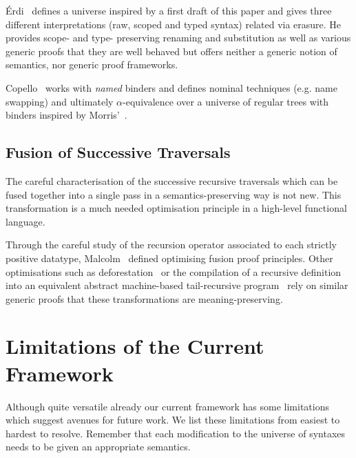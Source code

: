 Érdi~\citeyear{gergodraft} defines a universe inspired by a first draft of this
paper and gives three different interpretations (raw, scoped and typed syntax)
related via erasure. He provides scope- and type- preserving renaming and
substitution as well as various generic proofs that they are well behaved but
offers neither a generic notion of semantics, nor generic proof frameworks.

Copello~\citeyear{copello2017} works with \emph{named} binders and
defines nominal techniques (e.g. name swapping) and ultimately $\alpha$-equivalence
over a universe of regular trees with binders inspired by Morris'~\citeyear{morris-regulartt}.

\subsection{Fusion of Successive Traversals}

The careful characterisation of the successive recursive traversals which can be
fused together into a single pass in a semantics-preserving way is not new. This
transformation is a much needed optimisation principle in a high-level functional
language.

Through the careful study of the recursion operator associated to each
strictly positive datatype,
Malcolm~\citeyear{DBLP:journals/scp/Malcolm90} defined optimising
fusion proof principles.
%
Other optimisations such as deforestation~\cite{DBLP:journals/tcs/Wadler90}
or the compilation of a recursive definition into an equivalent abstract
machine-based tail-recursive program~\cite{DBLP:conf/icfp/CortinasS18}
rely on similar generic proofs that these transformations are meaning-preserving.


\section{Limitations of the Current Framework}


Although quite versatile already our current framework has some limitations
which suggest avenues for future work. We list these limitations from easiest
to hardest to resolve. Remember that each modification to the universe of
syntaxes needs to be given an appropriate semantics.

